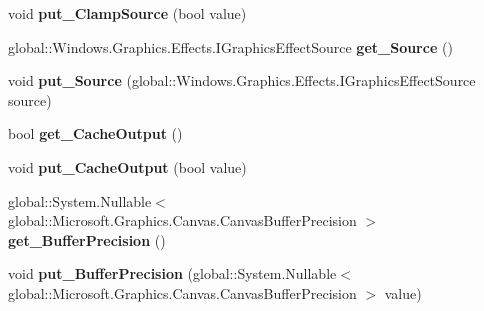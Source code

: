 \begin{DoxyCompactItemize}
\mbox{\label{class_microsoft_1_1_graphics_1_1_canvas_1_1_effects_1_1_contrast_effect_aba9bdffcb03711ad9dcf51b730e58b8e}} 
void {\bfseries put\+\_\+\+Clamp\+Source} (bool value)
\item 
\mbox{\label{class_microsoft_1_1_graphics_1_1_canvas_1_1_effects_1_1_contrast_effect_a72dc5fce02408757eaba54af8a0d067c}} 
global\+::\+Windows.\+Graphics.\+Effects.\+I\+Graphics\+Effect\+Source {\bfseries get\+\_\+\+Source} ()
\item 
\mbox{\label{class_microsoft_1_1_graphics_1_1_canvas_1_1_effects_1_1_contrast_effect_a80a8fa221aef734932fecc91048e1ee8}} 
void {\bfseries put\+\_\+\+Source} (global\+::\+Windows.\+Graphics.\+Effects.\+I\+Graphics\+Effect\+Source source)
\item 
\mbox{\label{class_microsoft_1_1_graphics_1_1_canvas_1_1_effects_1_1_contrast_effect_a4fe46686dd977f30e37f1501afa15b90}} 
bool {\bfseries get\+\_\+\+Cache\+Output} ()
\item 
\mbox{\label{class_microsoft_1_1_graphics_1_1_canvas_1_1_effects_1_1_contrast_effect_a1e32440921f9a7994c6dd646e9880c68}} 
void {\bfseries put\+\_\+\+Cache\+Output} (bool value)
\item 
\mbox{\label{class_microsoft_1_1_graphics_1_1_canvas_1_1_effects_1_1_contrast_effect_a61bc14a21a450d7a87ffcc2aa0e05690}} 
global\+::\+System.\+Nullable$<$ global\+::\+Microsoft.\+Graphics.\+Canvas.\+Canvas\+Buffer\+Precision $>$ {\bfseries get\+\_\+\+Buffer\+Precision} ()
\item 
\mbox{\label{class_microsoft_1_1_graphics_1_1_canvas_1_1_effects_1_1_contrast_effect_aa4928d12c80d69525761d5c7cd324653}} 
void {\bfseries put\+\_\+\+Buffer\+Precision} (global\+::\+System.\+Nullable$<$ global\+::\+Microsoft.\+Graphics.\+Canvas.\+Canvas\+Buffer\+Precision $>$ value)

\end{DoxyCompactItemize}
